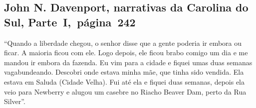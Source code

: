 \subsection{John N. Davenport, narrativas da Carolina do Sul, Parte~I,~página~242} \label{ref66}

``Quando a liberdade chegou, o senhor disse que a gente poderia ir
embora ou ficar. A maioria ficou com ele. Logo depois, ele ficou brabo
comigo um dia e me mandou ir embora da fazenda. Eu vim para a cidade e
fiquei umas duas semanas vagabundeando. Descobri onde estava minha mãe,
que tinha sido vendida. Ela estava em Saluda (Cidade Velha). Fui até ela
e fiquei duas semanas, depois ela veio para Newberry e alugou um casebre
no Riacho Beaver Dam, perto da Rua Silver''.


\pagebreak
\thispagestyle{empty}
\movetoevenpage
\thispagestyle{empty}


